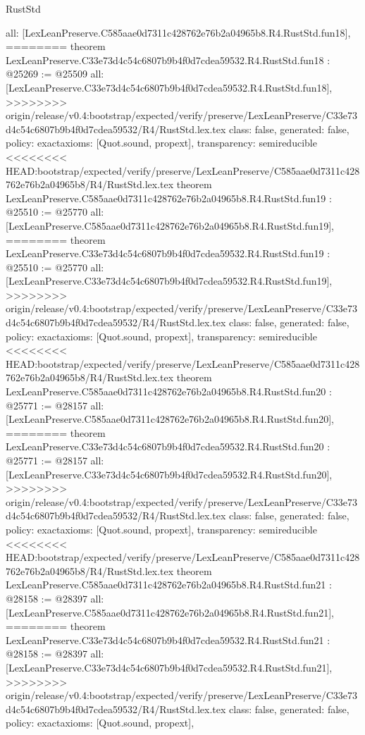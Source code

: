 \begin{lexlean}{RustStd}
\begin{coremodule}
{\begin{coremodule}
{{{{{{{{{{{{{{{{{{{{{  all: [LexLeanPreserve.C585aae0d7311c428762e76b2a04965b8.R4.RustStd.fun18],
========
theorem LexLeanPreserve.C33e73d4c54c6807b9b4f0d7cdea59532.R4.RustStd.fun18 : @25269 := @25509 {
  all: [LexLeanPreserve.C33e73d4c54c6807b9b4f0d7cdea59532.R4.RustStd.fun18],
>>>>>>>> origin/release/v0.4:bootstrap/expected/verify/preserve/LexLeanPreserve/C33e73d4c54c6807b9b4f0d7cdea59532/R4/RustStd.lex.tex
  class: false,
  generated: false,
  policy: exact{axioms: [Quot.sound, propext]},
  transparency: semireducible
}
<<<<<<<< HEAD:bootstrap/expected/verify/preserve/LexLeanPreserve/C585aae0d7311c428762e76b2a04965b8/R4/RustStd.lex.tex
theorem LexLeanPreserve.C585aae0d7311c428762e76b2a04965b8.R4.RustStd.fun19 : @25510 := @25770 {
  all: [LexLeanPreserve.C585aae0d7311c428762e76b2a04965b8.R4.RustStd.fun19],
========
theorem LexLeanPreserve.C33e73d4c54c6807b9b4f0d7cdea59532.R4.RustStd.fun19 : @25510 := @25770 {
  all: [LexLeanPreserve.C33e73d4c54c6807b9b4f0d7cdea59532.R4.RustStd.fun19],
>>>>>>>> origin/release/v0.4:bootstrap/expected/verify/preserve/LexLeanPreserve/C33e73d4c54c6807b9b4f0d7cdea59532/R4/RustStd.lex.tex
  class: false,
  generated: false,
  policy: exact{axioms: [Quot.sound, propext]},
  transparency: semireducible
}
<<<<<<<< HEAD:bootstrap/expected/verify/preserve/LexLeanPreserve/C585aae0d7311c428762e76b2a04965b8/R4/RustStd.lex.tex
theorem LexLeanPreserve.C585aae0d7311c428762e76b2a04965b8.R4.RustStd.fun20 : @25771 := @28157 {
  all: [LexLeanPreserve.C585aae0d7311c428762e76b2a04965b8.R4.RustStd.fun20],
========
theorem LexLeanPreserve.C33e73d4c54c6807b9b4f0d7cdea59532.R4.RustStd.fun20 : @25771 := @28157 {
  all: [LexLeanPreserve.C33e73d4c54c6807b9b4f0d7cdea59532.R4.RustStd.fun20],
>>>>>>>> origin/release/v0.4:bootstrap/expected/verify/preserve/LexLeanPreserve/C33e73d4c54c6807b9b4f0d7cdea59532/R4/RustStd.lex.tex
  class: false,
  generated: false,
  policy: exact{axioms: [Quot.sound, propext]},
  transparency: semireducible
}
<<<<<<<< HEAD:bootstrap/expected/verify/preserve/LexLeanPreserve/C585aae0d7311c428762e76b2a04965b8/R4/RustStd.lex.tex
theorem LexLeanPreserve.C585aae0d7311c428762e76b2a04965b8.R4.RustStd.fun21 : @28158 := @28397 {
  all: [LexLeanPreserve.C585aae0d7311c428762e76b2a04965b8.R4.RustStd.fun21],
========
theorem LexLeanPreserve.C33e73d4c54c6807b9b4f0d7cdea59532.R4.RustStd.fun21 : @28158 := @28397 {
  all: [LexLeanPreserve.C33e73d4c54c6807b9b4f0d7cdea59532.R4.RustStd.fun21],
>>>>>>>> origin/release/v0.4:bootstrap/expected/verify/preserve/LexLeanPreserve/C33e73d4c54c6807b9b4f0d7cdea59532/R4/RustStd.lex.tex
  class: false,
  generated: false,
  policy: exact{axioms: [Quot.sound, propext]},
}}}}}}}}}}}}}}}}}}}}}}}}}
\end{coremodule}}
\end{coremodule}
\end{lexlean}
